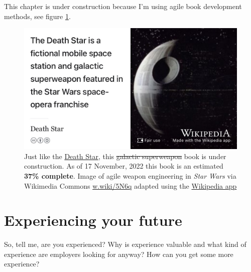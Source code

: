 \documentclass[
]{book}
\begin{document}
This chapter is under construction because I'm using agile book development methods, see figure \ref{fig:deathstar-fig}.

\begin{figure}

{\centering \includegraphics[width=0.99\linewidth]{images/DeathStar2} 

}

\caption{Just like the \href{https://en.wikipedia.org/wiki/Death_Star}{Death Star}, this \sout{galactic superweapon} book is under construction. As of 17 November, 2022 this book is an estimated \textbf{37\% complete}. Image of agile weapon engineering in \emph{Star Wars} via Wikimedia Commons \href{https://w.wiki/5N6q}{w.wiki/5N6q} adapted using the \href{https://apps.apple.com/gb/app/wikipedia/id324715238}{Wikipedia app}}\label{fig:deathstar-fig}
\end{figure}



\hypertarget{experiencing}{%
\chapter{Experiencing your future}\label{experiencing}}

So, tell me, are you experienced? Why is experience valuable and what kind of experience are employers looking for anyway? How can you get some more experience? 🤔
\end{document}
